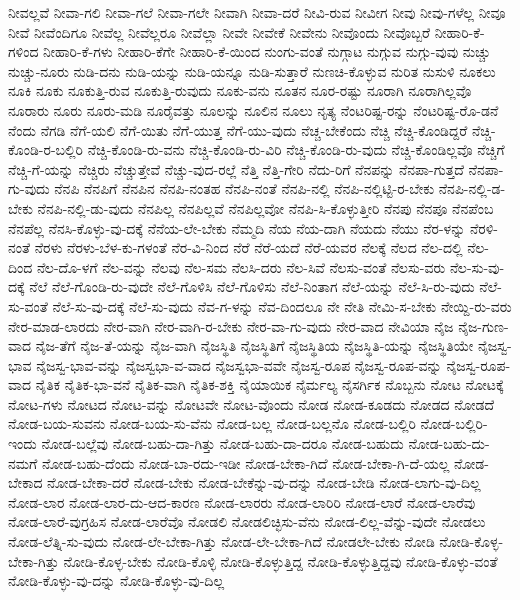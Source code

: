 {ನೀವಲ್ಲವೆ
ನೀವಾ-ಗಲಿ
ನೀವಾ-ಗಲೆ
ನೀವಾ-ಗಲೇ
ನೀವಾಗಿ
ನೀವಾ-ದರೆ
ನೀವಿ-ರುವ
ನೀವೀಗ
ನೀವು
ನೀವು-ಗಳೆಲ್ಲ
ನೀವೂ
ನೀವೆ
ನೀವೆಂದಿಗೂ
ನೀವೆಲ್ಲ
ನೀವೆಲ್ಲರೂ
ನೀವೆಲ್ಲಾ
ನೀವೇ
ನೀವೇಕೆ
ನೀವೇನು
ನೀವೊಂದು
ನೀವೊಬ್ಬರೆ
ನೀಹಾರಿ-ಕೆ-ಗಳಿಂದ
ನೀಹಾರಿ-ಕೆ-ಗಳು
ನೀಹಾರಿ-ಕೆಗೇ
ನೀಹಾರಿ-ಕೆ-ಯಿಂದ
ನುಂಗು-ವಂತೆ
ನುಗ್ಗಾಟ
ನುಗ್ಗುವ
ನುಗ್ಗು-ವುವು
ನುಚ್ಚು
ನುಚ್ಚು-ನೂರು
ನುಡಿ-ದನು
ನುಡಿ-ಯನ್ನು
ನುಡಿ-ಯನ್ನೂ
ನುಡಿ-ಸುತ್ತಾರೆ
ನುಣಚಿ-ಕೊಳ್ಳುವ
ನುರಿತ
ನುಸುಳಿ
ನೂಕಲು
ನೂಕಿ
ನೂಕು
ನೂಕುತ್ತಿ-ರುವ
ನೂಕುತ್ತಿ-ರುವುದು
ನೂಕು-ವನು
ನೂತನ
ನೂರ-ರಷ್ಟು
ನೂರಾಗಿ
ನೂರಾಗಿಲ್ಲವೊ
ನೂರಾರು
ನೂರು
ನೂರು-ಮಡಿ
ನೂರೈವತ್ತು
ನೂಲನ್ನು
ನೂಲಿನ
ನೂಲು
ನೃತ್ಯ
ನೆಂಟರಿಷ್ಟ-ರನ್ನು
ನೆಂಟರಿಷ್ಟ-ರೊ-ಡನೆ
ನೆಂದು
ನೆಗಡಿ
ನೆಗೆ-ಯಲಿ
ನೆಗೆ-ಯಿತು
ನೆಗೆ-ಯುತ್ತ
ನೆಗೆ-ಯು-ವುದು
ನೆಚ್ಚ-ಬೇಕೆಂದು
ನೆಚ್ಚಿ
ನೆಚ್ಚಿ-ಕೊಂಡಿದ್ದರೆ
ನೆಚ್ಚಿ-ಕೊಂಡಿ-ರ-ಬಲ್ಲಿರಿ
ನೆಚ್ಚಿ-ಕೊಂಡಿ-ರು-ವನು
ನೆಚ್ಚಿ-ಕೊಂಡಿ-ರು-ವಿರಿ
ನೆಚ್ಚಿ-ಕೊಂಡಿ-ರು-ವುದು
ನೆಚ್ಚಿ-ಕೊಂಡಿಲ್ಲವೊ
ನೆಚ್ಚಿಗೆ
ನೆಚ್ಚಿ-ಗೆ-ಯನ್ನು
ನೆಚ್ಚಿರು
ನೆಚ್ಚುತ್ತೇವೆ
ನೆಚ್ಚು-ವುದ-ರಲ್ಲೆ
ನೆತ್ತಿ
ನೆತ್ತಿ-ಗೇರಿ
ನೆದು-ರಿಗೆ
ನೆನಪನ್ನು
ನೆನಪಾ-ಗುತ್ತದೆ
ನೆನಪಾ-ಗು-ವುದು
ನೆನಪಿ
ನೆನಪಿಗೆ
ನೆನಪಿನ
ನೆನಪಿ-ನಂತಹ
ನೆನಪಿ-ನಂತೆ
ನೆನಪಿ-ನಲ್ಲಿ
ನೆನಪಿ-ನಲ್ಲಿಟ್ಟಿ-ರ-ಬೇಕು
ನೆನಪಿ-ನಲ್ಲಿ-ಡ-ಬೇಕು
ನೆನಪಿ-ನಲ್ಲಿ-ಡು-ವುದು
ನೆನಪಿಲ್ಲ
ನೆನಪಿಲ್ಲವೆ
ನೆನಪಿಲ್ಲವೋ
ನೆನಪಿ-ಸಿ-ಕೊಳ್ಳುತ್ತೀರಿ
ನೆನಪು
ನೆನಪೂ
ನೆನಪೆಂಬ
ನೆನಪೆಲ್ಲ
ನೆನಸಿ-ಕೊಳ್ಳು-ವು-ದಕ್ಕೆ
ನೆನೆಯ-ಲೇ-ಬೇಕು
ನೆಮ್ಮದಿ
ನೆಯ
ನೆಯ-ದಾಗಿ
ನೆಯದು
ನೆಯು
ನೆರ-ಳನ್ನು
ನೆರಳಿ-ನಂತೆ
ನೆರಳು
ನೆರಳು-ಬೆಳ-ಕು-ಗಳಂತೆ
ನೆರ-ವಿ-ನಿಂದ
ನೆರೆ
ನೆರೆ-ಯದೆ
ನೆರೆ-ಯವರ
ನೆಲಕ್ಕೆ
ನೆಲದ
ನೆಲ-ದಲ್ಲಿ
ನೆಲ-ದಿಂದ
ನೆಲ-ದೊ-ಳಗೆ
ನೆಲ-ವನ್ನು
ನೆಲವು
ನೆಲ-ಸಮ
ನೆಲಸಿ-ದರು
ನೆಲ-ಸಿವೆ
ನೆಲಸು-ವಂತೆ
ನೆಲಸು-ವರು
ನೆಲ-ಸು-ವು-ದಕ್ಕೆ
ನೆಲೆ
ನೆಲೆ-ಗೊಂಡಿ-ರು-ವುದೇ
ನೆಲೆ-ಗೊಳಿಸಿ
ನೆಲೆ-ಗೊಳಿಸು
ನೆಲೆ-ನಿಂತಾಗ
ನೆಲೆ-ಯನ್ನು
ನೆಲೆ-ಸಿ-ರು-ವುದು
ನೆಲೆ-ಸು-ವಂತೆ
ನೆಲೆ-ಸು-ವು-ದಕ್ಕೆ
ನೆಲೆ-ಸು-ವುದು
ನೆವ-ಗ-ಳನ್ನು
ನೆವ-ದಿಂದಲೂ
ನೇ
ನೇತಿ
ನೇಮಿ-ಸ-ಬೇಕು
ನೇಯ್ದಿ-ರು-ವರು
ನೇರ-ಮಾಡ-ಲಾರದು
ನೇರ-ವಾಗಿ
ನೇರ-ವಾಗಿ-ರ-ಬೇಕು
ನೇರ-ವಾ-ಗು-ವುದು
ನೇರ-ವಾದ
ನೇವಿಯಾ
ನೈಜ
ನೈಜ-ಗುಣ-ವಾದ
ನೈಜ-ತೆಗೆ
ನೈಜ-ತೆ-ಯನ್ನು
ನೈಜ-ವಾಗಿ
ನೈಜಸ್ಥಿತಿ
ನೈಜಸ್ಥಿತಿಗೆ
ನೈಜಸ್ಥಿತಿಯ
ನೈಜಸ್ಥಿತಿ-ಯನ್ನು
ನೈಜಸ್ಥಿತಿಯೇ
ನೈಜಸ್ವ-ಭಾವ
ನೈಜಸ್ವ-ಭಾವ-ವನ್ನು
ನೈಜಸ್ವಭಾ-ವ-ವಾದ
ನೈಜಸ್ವಭಾ-ವವೇ
ನೈಜಸ್ವ-ರೂಪ
ನೈಜಸ್ವ-ರೂಪ-ವನ್ನು
ನೈಜಸ್ವ-ರೂಪ-ವಾದ
ನೈತಿಕ
ನೈತಿಕ-ಭಾ-ವನೆ
ನೈತಿಕ-ವಾಗಿ
ನೈತಿಕ-ಶಕ್ತಿ
ನೈಯಾಯಿಕ
ನೈರ್ಮಲ್ಯ
ನೈಸರ್ಗಿಕ
ನೊಬ್ಬನು
ನೋಟ
ನೋಟಕ್ಕೆ
ನೋಟ-ಗಳು
ನೋಟದ
ನೋಟ-ವನ್ನು
ನೋಟವೇ
ನೋಟ-ವೊಂದು
ನೋಡ
ನೋಡ-ಕೂಡದು
ನೋಡದ
ನೋಡದೆ
ನೋಡ-ಬಯ-ಸುವನು
ನೋಡ-ಬಯ-ಸು-ವೆನು
ನೋಡ-ಬಲ್ಲ
ನೋಡ-ಬಲ್ಲನೊ
ನೋಡ-ಬಲ್ಲಿರಿ
ನೋಡ-ಬಲ್ಲಿರಿ-ಇಂದು
ನೋಡ-ಬಲ್ಲೆವು
ನೋಡ-ಬಹು-ದಾ-ಗಿತ್ತು
ನೋಡ-ಬಹು-ದಾ-ದರೂ
ನೋಡ-ಬಹುದು
ನೋಡ-ಬಹು-ದು-ನಮಗೆ
ನೋಡ-ಬಹು-ದೆಂದು
ನೋಡ-ಬಾ-ರದು-ಇಡೀ
ನೋಡ-ಬೇಕಾ-ಗಿದೆ
ನೋಡ-ಬೇಕಾ-ಗಿ-ದೆ-ಯಲ್ಲ
ನೋಡ-ಬೇಕಾದ
ನೋಡ-ಬೇಕಾ-ದರೆ
ನೋಡ-ಬೇಕು
ನೋಡ-ಬೇಕೆನ್ನು-ವು-ದನ್ನು
ನೋಡ-ಬೇಡಿ
ನೋಡ-ಲಾಗು-ವು-ದಿಲ್ಲ
ನೋಡ-ಲಾರ
ನೋಡ-ಲಾರ-ದು-ಆದ-ಕಾರಣ
ನೋಡ-ಲಾರರು
ನೋಡ-ಲಾರಿರಿ
ನೋಡ-ಲಾರೆ
ನೋಡ-ಲಾರೆವು
ನೋಡ-ಲಾರೆ-ವುಗ್ರಹಿಸ
ನೋಡ-ಲಾರೆವೊ
ನೋಡಲಿ
ನೋಡಲಿಚ್ಛಿಸು-ವೆನು
ನೋಡ-ಲಿಲ್ಲ-ವೆನ್ನು-ವುದೇ
ನೋಡಲು
ನೋಡ-ಲೆತ್ನಿ-ಸು-ವುದು
ನೋಡ-ಲೇ-ಬೇಕಾ-ಗಿತ್ತು
ನೋಡ-ಲೇ-ಬೇಕಾ-ಗಿದೆ
ನೋಡಲೇ-ಬೇಕು
ನೋಡಿ
ನೋಡಿ-ಕೊಳ್ಳ-ಬೇಕಾ-ಗಿತ್ತು
ನೋಡಿ-ಕೊಳ್ಳ-ಬೇಕು
ನೋಡಿ-ಕೊಳ್ಳಿ
ನೋಡಿ-ಕೊಳ್ಳುತ್ತಿದ್ದ
ನೋಡಿ-ಕೊಳ್ಳುತ್ತಿದ್ದವು
ನೋಡಿ-ಕೊಳ್ಳು-ವಂತೆ
ನೋಡಿ-ಕೊಳ್ಳು-ವು-ದನ್ನು
ನೋಡಿ-ಕೊಳ್ಳು-ವು-ದಿಲ್ಲ
}
